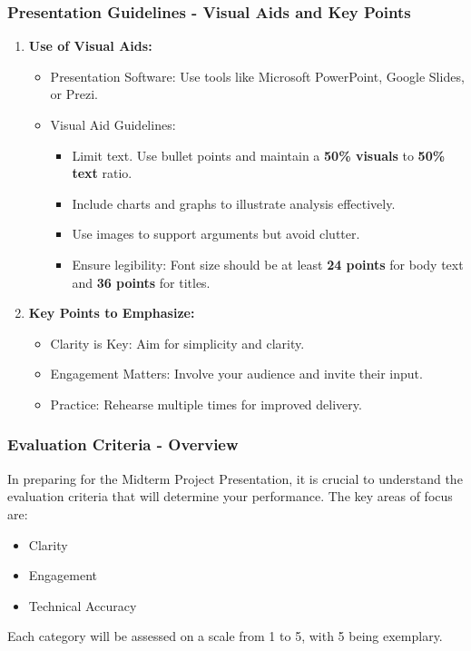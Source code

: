 \documentclass[aspectratio=169]{beamer}
\begin{document}
\begin{frame}[fragile]
    \frametitle{Presentation Guidelines - Visual Aids and Key Points}
    \begin{enumerate}
        \item \textbf{Use of Visual Aids:}
        \begin{itemize}
            \item Presentation Software: Use tools like Microsoft PowerPoint, Google Slides, or Prezi.
            \item Visual Aid Guidelines:
            \begin{itemize}
                \item Limit text. Use bullet points and maintain a \textbf{50\% visuals} to \textbf{50\% text} ratio.
                \item Include charts and graphs to illustrate analysis effectively.
                \item Use images to support arguments but avoid clutter.
                \item Ensure legibility: Font size should be at least \textbf{24 points} for body text and \textbf{36 points} for titles.
            \end{itemize}
        \end{itemize}

        \item \textbf{Key Points to Emphasize:}
        \begin{itemize}
            \item Clarity is Key: Aim for simplicity and clarity.
            \item Engagement Matters: Involve your audience and invite their input.
            \item Practice: Rehearse multiple times for improved delivery.
        \end{itemize}
    \end{enumerate}
\end{frame}

\begin{frame}[fragile]
    \frametitle{Evaluation Criteria - Overview}
    In preparing for the Midterm Project Presentation, it is crucial to understand the evaluation criteria that will determine your performance. 
    The key areas of focus are:
    \begin{itemize}
        \item Clarity
        \item Engagement
        \item Technical Accuracy
    \end{itemize}
    Each category will be assessed on a scale from 1 to 5, with 5 being exemplary.
\end{frame}
\end{document}

